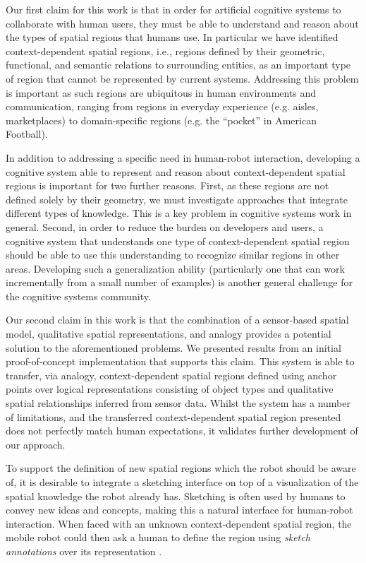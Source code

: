 \documentclass[letterpaper]{article}
\begin{document}
Our first claim for this work is that in order for artificial cognitive systems to collaborate with human users, they must be able to understand and reason about the types of spatial regions that humans use. In particular we have identified context-dependent spatial regions, i.e., regions defined by their geometric, functional, and semantic relations to surrounding entities, as an important type of region that cannot be represented by current systems. Addressing this problem is important as such regions are ubiquitous in human environments and communication, ranging from regions in everyday experience (e.g. aisles, marketplaces) to domain-specific regions (e.g. the ``pocket'' in American Football). 

In addition to addressing a specific need in human-robot interaction, developing a cognitive system able to represent and reason about context-dependent spatial regions is important for two further reasons. First, as these regions are not defined solely by their geometry, we must investigate approaches that integrate different types of knowledge. This is a key problem in cognitive systems work in general. Second, in order to reduce the burden on developers and users, a cognitive system that understands one type of context-dependent spatial region should be able to use this understanding to recognize similar regions in other areas. Developing such a generalization ability (particularly one that can work incrementally from a small number of examples) is another general challenge for the cognitive systems community.

Our second claim in this work is that the combination of a sensor-based spatial model, qualitative spatial representations, and analogy provides a potential solution to the aforementioned problems. We presented results from an initial proof-of-concept implementation that supports this claim. This system is able to transfer, via analogy, context-dependent spatial regions defined using anchor points over logical representations consisting of  object types and qualitative spatial relationships inferred from sensor data. Whilst the system has a number of limitations, and the transferred context-dependent spatial region presented does not perfectly match human expectations, it validates further development of our approach. 

To support the definition of new spatial regions which the robot should be aware of, it is desirable to integrate a sketching interface on top of a visualization of the spatial knowledge the robot already has. Sketching \cite{Forbus/etal:2009a} is often used by humans to convey new ideas and concepts, making this a natural interface for human-robot interaction. When faced with an unknown context-dependent spatial region, the mobile robot could then ask a human to define the region using \textit{sketch annotations} over its representation \cite{Klenk/etal2005}. 
\end{document}
